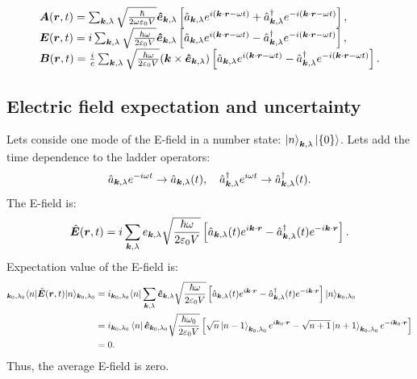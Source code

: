 \begin{align}
    \begin{array}{l}
    \bm{A}(\bm{r},t)=\sum_{\bm{k},\lambda}\sqrt{\frac{\hbar}{2\omega\varepsilon_0V}}\bm{\hat{e}}_{\bm{k},\lambda}\left[\hat{a}_{\bm{k},\lambda}e^{i(\bm{k}\cdot\bm{r}-\omega t)}+\hat{a}^\dagger_{\bm{k},\lambda}e^{-i(\bm{k}\cdot\bm{r}-\omega t)}\right],\\
    \bm{E}(\bm{r},t)=i\sum_{\bm{k},\lambda}\sqrt{\frac{\hbar\omega}{2\varepsilon_0V}}\bm{\hat{e}}_{\bm{k},\lambda}\left[\hat{a}_{\bm{k},\lambda}e^{i(\bm{k}\cdot\bm{r}-\omega t)}-\hat{a}^\dagger_{\bm{k},\lambda}e^{-i(\bm{k}\cdot\bm{r}-\omega t)}\right],\\
    \bm{B}(\bm{r},t)=\frac{i}{c}\sum_{\bm{k},\lambda}\sqrt{\frac{\hbar\omega}{2\varepsilon_0V}}(\bm{k}\times\bm{\hat{e}}_{\bm{k},\lambda})\left[\hat{a}_{\bm{k},\lambda}e^{i(\bm{k}\cdot\bm{r}-\omega t)}-\hat{a}^\dagger_{\bm{k},\lambda}e^{-i(\bm{k}\cdot\bm{r}-\omega t)}\right].
    \end{array}\label{eq:emfieldquantization}
\end{align}


\subsection{Electric field expectation and uncertainty}
Lets conside one mode of the E-field in a number state: $\left|n\right\rangle_{\bm{k},\lambda}\left|\{0\}\right\rangle$.
Lets add the time dependence to the ladder operators:
\begin{align*}
    \hat{a}_{\bm{k},\lambda}e^{-i\omega t}\to\hat{a}_{\bm{k},\lambda}(t),\quad\hat{a}^\dagger_{\bm{k},\lambda}e^{i\omega t}\to\hat{a}^\dagger_{\bm{k},\lambda}(t).
\end{align*}
The E-field is:
\begin{align*}
    \hat{\bm{E}}(\bm{r},t)=i\sum_{\bm{k},\lambda}e_{\bm{k},\lambda}\sqrt{\frac{\hbar\omega}{2\varepsilon_0V}}\left[\hat{a}_{\bm{k},\lambda}(t)e^{i\bm{k}\cdot\bm{r}}-\hat{a}^\dagger_{\bm{k},\lambda}(t)
    e^{-i\bm{k}\cdot\bm{r}}\right].
\end{align*}
Expectation value of the E-field is:
\begin{align*}
    _{\bm{k}_0,\lambda_0}\langle n|\hat{\bm{E}}(\bm{r},t)|n\rangle_{\bm{k}_0,\lambda_0}&=i_{\bm{k}_0,\lambda_0}\langle n|\sum_{\bm{k},\lambda}\bm{\hat{e}}_{\bm{k},\lambda}\sqrt{\frac{\hbar\omega}{2\varepsilon_0V}}\left[\hat{a}_{\bm{k},\lambda}(t)e^{i\bm{k}\cdot\bm{r}}-\hat{a}^\dagger_{\bm{k},\lambda}(t)e^{-i\bm{k}\cdot\bm{r}}\right]|n\rangle_{\bm{k}_0,\lambda_0}\\
    &=i_{\bm{k}_0,\lambda_0}\left\langle n\right|\bm{\hat{e}}_{\bm{k}_0,\lambda_0}\sqrt{\frac{\hbar\omega_0}{2\varepsilon_0V}}\left[\sqrt{n}\left|n-1\right\rangle_{\bm{k}_0,\lambda_0}e^{i\bm{k}_0\cdot\bm{r}}-\sqrt{n+1}\left|n+1\right\rangle_{\bm{k}_0,\lambda_0}e^{-i\bm{k}_0\cdot\bm{r}}\right]\\
    &=0.
\end{align*}
Thus, the average E-field is zero.

